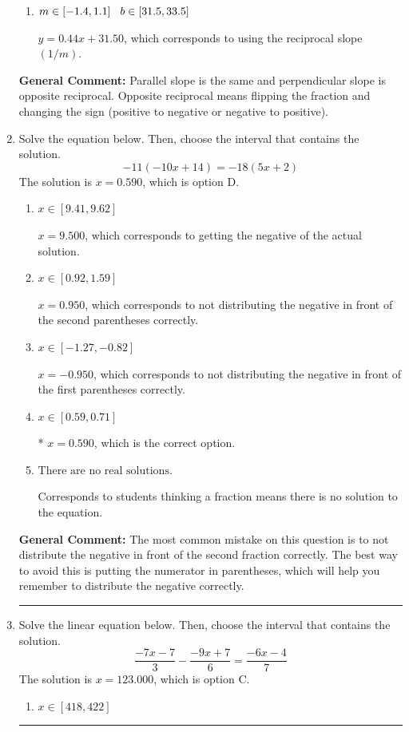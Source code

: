 \documentclass{extbook}[14pt]
\newcommand{\litem}[1]{\item #1

\rule{\textwidth}{0.4pt}}
\begin{document}
\begin{enumerate}
{\begin{enumerate}[label=\Alph*.]
 $y = 2.25x - 31.50$, which corresponds to using the correct slope and getting the negative $y$-intercept.
\item \( m \in [-1.4, 1.1] \hspace*{3mm} b \in [31.5, 33.5] \)

 $y = 0.44x + 31.50$, which corresponds to using the reciprocal slope $(1/m)$.
\end{enumerate}

\textbf{General Comment:} Parallel slope is the same and perpendicular slope is opposite reciprocal. Opposite reciprocal means flipping the fraction and changing the sign (positive to negative or negative to positive).
}
\litem{
Solve the equation below. Then, choose the interval that contains the solution.
\[ -11(-10x + 14) = -18(5x + 2) \]
The solution is \( x = 0.590 \), which is option D.\begin{enumerate}[label=\Alph*.]
\item \( x \in [9.41, 9.62] \)

$x = 9.500$, which corresponds to getting the negative of the actual solution.
\item \( x \in [0.92, 1.59] \)

$x = 0.950$, which corresponds to not distributing the negative in front of the second parentheses correctly.
\item \( x \in [-1.27, -0.82] \)

$x = -0.950$, which corresponds to not distributing the negative in front of the first parentheses correctly.
\item \( x \in [0.59, 0.71] \)

* $x = 0.590$, which is the correct option.
\item \( \text{There are no real solutions.} \)

Corresponds to students thinking a fraction means there is no solution to the equation.
\end{enumerate}

\textbf{General Comment:} The most common mistake on this question is to not distribute the negative in front of the second fraction correctly. The best way to avoid this is putting the numerator in parentheses, which will help you remember to distribute the negative correctly.
}
\litem{
Solve the linear equation below. Then, choose the interval that contains the solution.
\[ \frac{-7x -7}{3} - \frac{-9x + 7}{6} = \frac{-6x -4}{7} \]
The solution is \( x = 123.000 \), which is option C.\begin{enumerate}[label=\Alph*.]
\item \( x \in [418, 422] \)


\end{enumerate}}
\end{enumerate}
\end{document}
